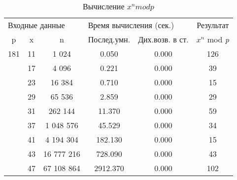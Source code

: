 \newpage
\begin{table}
\centering
\begin{tabular}{|*{6}{c|}}
\hline 
\multicolumn{3}{l}{Входные данные} & \multicolumn{2}{l}{Время вычисления (сек.)} & Результат\\
p & x & n & Послед.умн. & Дих.возв. в ст. & $x^n$ mod {\it p}\\ 
\hline
181 & 11 & 1 024 & 0.050& 0.000& 126\\
 & 17& 4 096& 0.221 & 0.000& 39\\
 & 23 & 16 384 & 0.710 & 0.000& 15\\
 & 29 & 65 536 & 2.859 & 0.000& 29\\
 & 31 & 262 144 & 11.370 & 0.000& 59\\
 & 37 & 1 048 576 & 45.529 & 0.000 & 34\\
 & 41 & 4 194 304 & 182.130 & 0.000 & 15\\
 & 43 & 16 777 216 & 728.090 & 0.000 & 43\\
 & 47 & 67 108 864 & 2912.370 & 0.000 & 102\\
\hline
\end{tabular}
\caption{ Вычисление $x^n mod p$}
\end{table}

